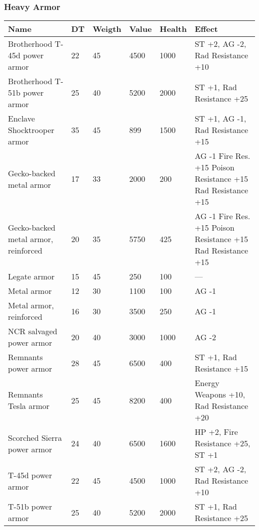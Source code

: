 
\subsubsection{Heavy Armor}
\begin{longtable}{|p{5cm}|p{0.9cm}|p{1.2cm}|p{1.2cm}|p{1.2cm}|p{5.5cm}|}
\hline
\bfseries Name & \bfseries DT & \bfseries Weigth & \bfseries Value & \bfseries Health & \bfseries Effect \\
\hline
\endhead
Brotherhood T-45d power armor & 22 & 45 & 4500 & 1000 & ST +2, AG -2, Rad Resistance +10 \\
Brotherhood T-51b power armor & 25 & 40 & 5200 & 2000 & ST +1, Rad Resistance +25 \\
Enclave Shocktrooper armor & 35 & 45 & 899 & 1500 & ST +1, AG -1, Rad Resistance +15 \\
Gecko-backed metal armor & 17 & 33 & 2000 & 200 & AG -1 Fire Res. +15 Poison Resistance +15 Rad Resistance +15 \\
Gecko-backed metal armor, reinforced & 20 & 35 & 5750 & 425 & AG -1 Fire Res. +15 Poison Resistance +15 Rad Resistance +15 \\
Legate armor & 15 & 45 & 250 & 100 & — \\
Metal armor & 12 & 30 & 1100 & 100 & AG -1 \\
Metal armor, reinforced & 16 & 30 & 3500 & 250 & AG -1 \\
NCR salvaged power armor & 20 & 40 & 3000 & 1000 & AG -2 \\
Remnants power armor & 28 & 45 & 6500 & 400 & ST +1, Rad Resistance +15 \\
Remnants Tesla armor & 25 & 45 & 8200 & 400 & Energy Weapons +10, Rad Resistance +20 \\
Scorched Sierra power armor & 24 & 40 & 6500 & 1600 & HP +2, Fire Resistance +25, ST +1 \\
T-45d power armor & 22 & 45 & 4500 & 1000 & ST +2, AG -2, Rad Resistance +10 \\
T-51b power armor & 25 & 40 & 5200 & 2000 & ST +1, Rad Resistance +25 \\
\hline
\end{longtable}
